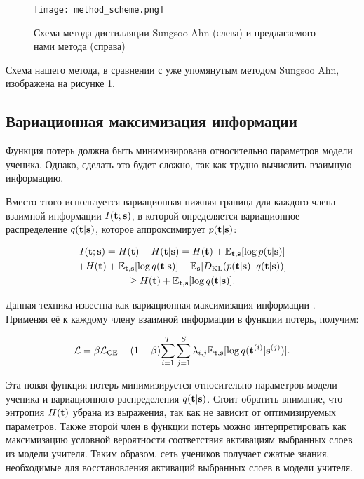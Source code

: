 \begin{figure}[!htbp]
    \centering
    \texttt{[image: method\_scheme.png]}
    \caption{Схема метода дистилляции Sungsoo Ahn (слева) и предлагаемого нами метода (справа)}
    \label{fig:method_scheme}
\end{figure}

Схема нашего метода, в сравнении с уже упомянутым методом Sungsoo Ahn\cite{Ahn_2019_CVPR}, изображена на рисунке \ref{fig:method_scheme}.


\subsection{Вариационная максимизация информации}

Функция потерь должна быть минимизирована относительно параметров модели ученика. Однако, сделать это будет сложно, так как трудно вычислить взаимную информацию.

Вместо этого используется вариационная нижняя граница для каждого члена взаимной информации $I(\bold{t}; \bold{s})$,
в которой определяется вариационное распределение $q(\bold{t}|\bold{s})$, которое аппроксимирует $p(\bold{t}|\bold{s})$:

\begin{multline}
    I(\bold{t}; \bold{s}) = H(\bold{t}) - H(\bold{t} | \bold{s}) =  H(\bold{t}) + \mathbb{E}_{\bold{t},\bold{s}}[\log{p(\bold{t}|\bold{s})}] \\
    + H(\bold{t}) + \mathbb{E}_{\bold{t},\bold{s}}[\log{q(\bold{t}|\bold{s})}] + \mathbb{E}_{\bold{s}}[D_{\text{KL}}(p(\bold{t}|\bold{s})||q(\bold{t}|\bold{s}))] \\
    \geq H(\bold{t}) + \mathbb{E}_{\bold{t},\bold{s}}[\log{q(\bold{t}|\bold{s})}].
\end{multline}

Данная техника известна как вариационная максимизация информации \cite{barber2004algorithm}. Применяя её к каждому члену взаимной информации в функции потерь, получим:

$$ \mathcal{L} = \beta \mathcal{L}_\text{CE} - (1 - \beta){\sum_{i=1}^T \sum_{j=1}^S \lambda_{i, j} \mathbb{E}_{\bold{t},\bold{s}}[\log{q(\bold{t}^{(i)}|\bold{s}^{(j)})}] }.$$

Эта новая функция потерь минимизируется относительно параметров модели ученика и вариационного распределения $q(\bold{t}|\bold{s})$.
Стоит обратить внимание, что энтропия $H(\bold{t})$ убрана из выражения, так как не зависит от оптимизируемых параметров.
Также второй член в функции потерь можно интерпретировать как максимизацию условной вероятности
соответствия активациям выбранных слоев из модели учителя.
Таким образом, сеть учеников получает сжатые знания, необходимые для восстановления активаций выбранных слоев в модели учителя.


